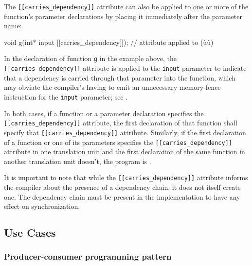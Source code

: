 The \lstinline![[carries_dependency]]! attribute can also be applied
to one or more of the function's parameter declarations by placing it
immediately after the parameter name:

\begin{emcppslisting}
void g(int* input [[carries_dependency]]); // attribute applied to (ù{}ù)
\end{emcppslisting}

\noindent In the declaration of function \lstinline!g! in the example above, the
\lstinline![[carries_dependency]]! attribute is applied to the
\lstinline!input! parameter to indicate that a dependency is carried
through that parameter into the function, which may obviate the
compiler's having to emit an unnecessary memory-fence instruction for
the \lstinline!input! parameter; see .

In both cases, if a function or a parameter declaration specifies the
\lstinline![[carries_dependency]]! attribute, the first declaration of
that function shall specify that \lstinline![[carries_dependency]]!
attribute. Similarly, if the first declaration of a function or one of
its parameters specifies the \lstinline![[carries_dependency]]! attribute
in one translation unit and the first declaration of the same function
in another translation unit doesn't, the program is .


It is important to note that while the \lstinline![[carries_dependency]]! attribute informs the compiler about the presence of a dependency chain, it does not itself create one.  The dependency chain must be present in the implementation to have any effect on synchronization.

\subsection[Use Cases]{Use Cases}\label{use-cases-carriesdependency}

\subsubsection[Producer-consumer programming pattern]{Producer-consumer programming pattern}\label{producer-consumer-programming-pattern}


